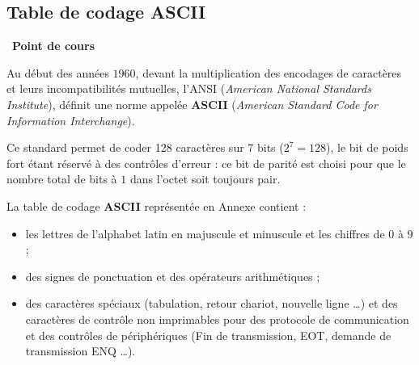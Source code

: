 \documentclass[a4paper, french, 12pt]{article}  %
\newcounter{cours}
\newenvironment{cours}[1]
{\par \medskip   \addtocounter{cours}{1} \noindent  
\begin{bclogo}[arrondi =0.1,  ombre = true, barre=none, logo=\bcbook, marge=4]{~\textbf{Point de cours} \textbf{\thecours} {\itshape #1} }  \par}
{
\end{bclogo}
 \par \bigskip }
\begin{document}
\subsection{Table de codage ASCII}


\vspace*{-20pt}

\begin{cours}{}
Au début des années $1960$,  devant la multiplication des encodages de caractères et leurs incompatibilités mutuelles,  l'ANSI (\textit{American National Standards Institute}), définit une norme appelée  \textbf{ASCII}  (\textit{American Standard Code for Information Interchange}). 



Ce standard permet de coder 128 caractères sur 7 bits ($2^7=128$), le bit de poids fort étant réservé à des contrôles d'erreur : ce bit de parité est choisi pour que le nombre total de bits à $1$ dans l'octet soit toujours pair.

La table de codage \textbf{ASCII} représentée en Annexe \pageref{annexe} contient :

\begin{itemize}
\item  les lettres de l'alphabet latin en majuscule et minuscule et les chiffres de $0$ à $9$ ;
\item des signes de ponctuation et des opérateurs arithmétiques ;
\item des caractères spéciaux (tabulation, retour chariot, nouvelle ligne \ldots) et des caractères de contrôle non imprimables pour des protocole de communication et des contrôles de périphériques (Fin de transmission, EOT, demande de transmission ENQ \ldots).
\end{itemize}
\end{cours}

\vspace*{-20pt}
\end{document}

